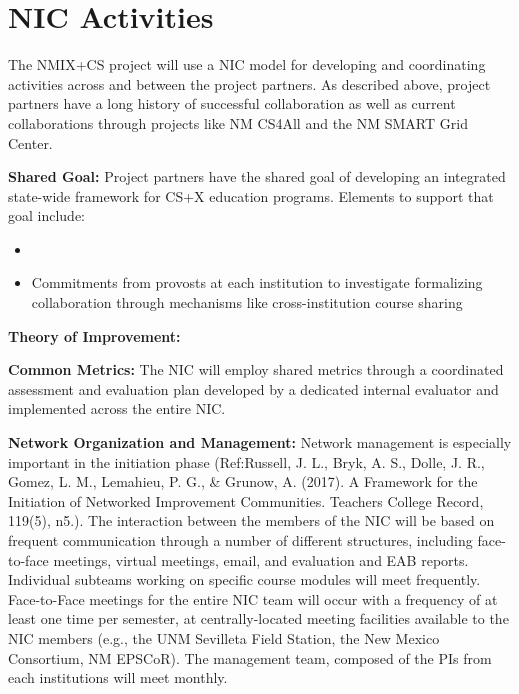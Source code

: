\section{NIC Activities}
The NMIX+CS project will use a NIC model for developing and coordinating activities across and between the project partners. As described above, project partners have a long history of successful collaboration as well as current collaborations through projects like NM CS4All and the NM SMART Grid Center. 

\textbf{Shared Goal:} Project partners have the shared goal of developing an integrated state-wide framework for CS+X education programs. Elements to support that goal include:
\begin{itemize}
        \item 
        \item Commitments from provosts at each institution to investigate formalizing collaboration through mechanisms like cross-institution course sharing
\end{itemize}
\textbf{Theory of Improvement:}

\textbf{Common Metrics:} The NIC will employ shared metrics through a coordinated assessment and evaluation plan developed by a dedicated internal evaluator and implemented across the entire NIC.

\textbf{Network Organization and Management:} Network management is especially important in the initiation phase (Ref:Russell, J. L., Bryk, A. S., Dolle, J. R., Gomez, L. M., Lemahieu, P. G., & Grunow, A. (2017). A Framework for the Initiation of Networked Improvement Communities. Teachers College Record, 119(5), n5.). The interaction between the members of the NIC will be based on frequent communication through a number of different structures, including face-to-face meetings, virtual meetings, email, and evaluation and EAB reports. Individual subteams working on specific course modules will meet frequently. Face-to-Face meetings for the entire NIC team will occur with a frequency of at least one time per semester, at centrally-located meeting facilities available to the NIC members (e.g., the UNM Sevilleta Field Station, the New Mexico Consortium, NM EPSCoR). The management team, composed of the PIs from each institutions will meet monthly.